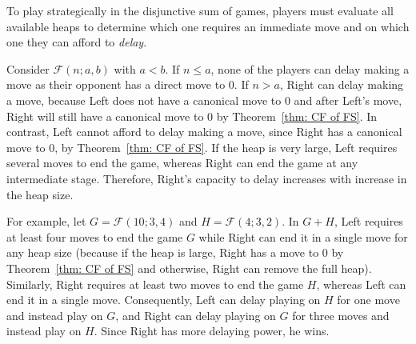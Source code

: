\documentclass[oneside,reqno]{amsart}
\newcommand{\fs}{\mathcal{F}}
\begin{document}

To play strategically in the disjunctive sum of games, players must evaluate all available heaps to determine which one requires an immediate move and on which one they can afford to {\em delay}.

Consider $\fs(n;a,b)$ with $a<b$. If $n\le a$, none of the players can delay making a move as their opponent has a direct move to $0$. If $n>a$, Right can delay making a move, because Left does not have a canonical move to $0$ and after Left's move, Right will still have a canonical move to $0$ by Theorem~\ref{thm: CF of FS}. In contrast, Left cannot afford to delay making a move, since Right has a canonical move to $0$, by Theorem~\ref{thm: CF of FS}. If the heap is very large, Left requires several moves to end the game, whereas Right can end the game at any intermediate stage. Therefore, Right's capacity to delay increases with increase in the heap size.

\iffalse
For example, let $G=\fs(10;3,4)$ and $H=\fs(4;3,2)$. In $G+H$, Left requires at least four moves to end the game $G$ while Right can end it in a single move for any heap size (because if the heap is large, Right has a move to 0 by Theorem~\ref{thm: CF of FS} and otherwise, Right can remove the full heap). Similarly, Right requires at least two moves to end the game $H$, whereas Left can end it in a single move. Consequently, Left can delay playing on $H$ for one move and instead play on $G$, and Right can delay playing on $G$ for three moves and instead play on $H$. Since Right has more delaying power, he wins.
\end{document}
